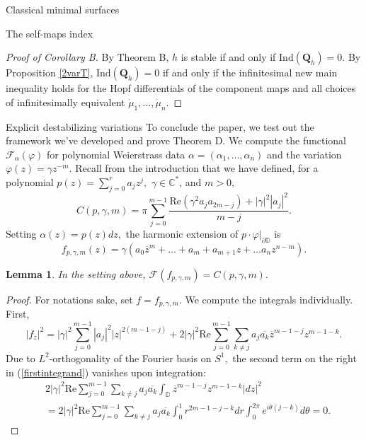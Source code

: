 \documentclass[10pt]{amsart}
\newtheorem{lem}[thm]{Lemma}
\theoremstyle{definition}
\begin{document}
\begin{section}{Classical minimal surfaces}
\begin{subsection}{The self-maps index}
\begin{proof}[Proof of Corollary B]
By Theorem B, $h$ is stable if and only if $\textrm{Ind}(\mathbf{Q}_h)=0.$ By Proposition \ref{2varT}, $\textrm{Ind}(\mathbf{Q}_h)=0$ if and only if the infinitesimal new main inequality holds for the Hopf differentials of the component maps and all choices of infinitesimally equivalent $\dot{\mu}_1,\dots, \dot{\mu}_n$.
\end{proof}


\end{subsection}


\begin{subsection}{Explicit destabilizing variations}
To conclude the paper, we test out the framework we've developed and prove Theorem D. We compute the functional $\mathcal{F}_{\alpha}(\varphi)$ for polynomial Weierstrass data $\alpha=(\alpha_1,\dots, \alpha_n)$ and the variation $\varphi(z)=\gamma z^{-m}.$ Recall from the introduction that we have defined, for a polynomial $p(z) = \sum_{j=0}^r a_jz^j,$ $\gamma\in\mathbb{C}^*$, and $m>0,$  \begin{equation}\label{Cpsi}
    C(p,\gamma,m) =\pi\sum_{j=0}^{m-1}\frac{\textrm{Re}(\gamma^2a_ja_{2m-j})+|\gamma|^2|a_j|^2}{m-j}.
\end{equation}
Setting $\alpha(z)=p(z)dz,$ the harmonic extension of $p\cdot \varphi|_{\partial\mathbb{D}}$ is $$f_{p,\gamma,m}(z)=\gamma(a_0\overline{z}^m+\dots + a_m + a_{m+1}z + \dots a_nz^{n-m}).$$ 
\begin{lem}\label{form}
In the setting above, $\mathcal{F}(f_{p,\gamma,m})=C(p,\gamma,m).$
\end{lem}
\begin{proof}
For notations sake, set $f=f_{p,\gamma,m}$. We compute the integrals individually. First, 
\begin{equation}\label{firstintegrand}
    |f_{\overline{z}}|^2= |\gamma|^2\sum_{j=0}^{m-1}|a_j|^2|z|^{2(m-1-j)}+2|\gamma|^2\textrm{Re}\sum_{j=0}^{m-1}\sum_{k\neq j}a_j\overline{a_k}\overline{z}^{m-1-j}z^{m-1-k}.
\end{equation}
Due to $L^2$-orthogonality of the Fourier basis on $S^1,$ the second term on the right in (\ref{firstintegrand}) vanishes upon integration: 
\begin{align*}
    &2|\gamma|^2\textrm{Re}\sum_{j=0}^{m-1}\sum_{k\neq j}a_j\overline{a_k}\int_{\mathbb{D}}\overline{z}^{m-1-j}z^{m-1-k}|dz|^2 \\
    &= 2|\gamma|^2\textrm{Re}\sum_{j=0}^{m-1}\sum_{k\neq j}a_j\overline{a_k}\int_0^1 r^{2m-1-j-k}dr \int_0^{2\pi} e^{i\theta(j-k)} d\theta =0.

\end{align*}
\end{proof}
\end{subsection}
\end{section}
\end{document}
